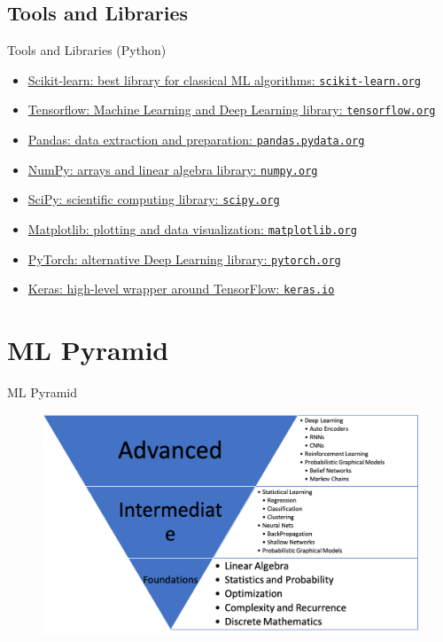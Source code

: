 \documentclass{beamer}
\begin{document}
\subsection{Tools and Libraries}
\begin{frame}{Tools and Libraries (Python)}
\begin{itemize}
    \item \href{https://scikit-learn.org/stable/index.html}{Scikit-learn: best library for classical ML algorithms: \texttt{scikit-learn.org}}
    \item \href{https://www.tensorflow.org/}{Tensorflow: Machine Learning and Deep Learning library: \texttt{tensorflow.org}}
    \item \href{https://pandas.pydata.org/}{Pandas: data extraction and preparation: \texttt{pandas.pydata.org}}
    \item \href{https://numpy.org/}{NumPy: arrays and linear algebra library: \texttt{numpy.org}}
    \item \href{https://www.scipy.org/}{SciPy: scientific computing library: \texttt{scipy.org}}
    \item \href{https://matplotlib.org/}{Matplotlib: plotting and data visualization: \texttt{matplotlib.org}}
    \item \href{https://pytorch.org/}{PyTorch: alternative Deep Learning library: \texttt{pytorch.org}}
    \item \href{https://keras.io/}{Keras: high-level wrapper around TensorFlow: \texttt{keras.io}}
\end{itemize}
\end{frame}

\section{ML Pyramid}
\label{sec:MLPyramid}
\begin{frame}{ML Pyramid}
\begin{figure}
\centering
\captionsetup{justification=centering}
\includegraphics[scale=0.45]{AIPyramid.png}
\end{figure}
\framebreak
\end{frame}
\end{document}
